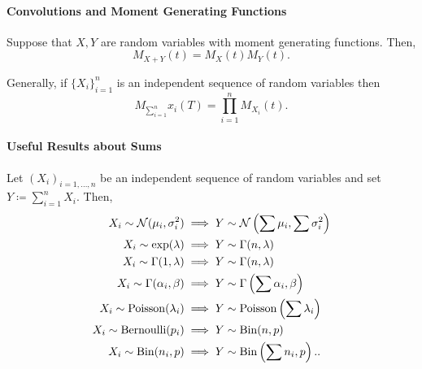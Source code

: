 \paragraph{Convolutions and Moment Generating Functions}
Suppose that \( X, Y \) are random variables with moment
generating functions. Then, \[
    M_{X + Y}(t) = M_X(t) M_Y(t)
.\]

Generally, if \( \{X_i\}_{i=1}^n  \) is an independent sequence of random variables
then  \[
    M_{\sum_{i=1}^n} x_i (T) = \prod_{i=1}^n M_{X_i} (t)
.\]

\paragraph{Useful Results about Sums}
Let \( (X_i)_{i = 1, \ldots, n} \) be an independent sequence of random
variables and set \( Y \coloneqq \sum_{i=1}^{n} X_i \).
Then,
\begin{align*}
    X_i \sim \mathcal{N}(\mu_i, \sigma_i^2)
        &\implies Y \sim \mathcal{N} \left( \sum \mu_i, \sum \sigma_i^2 \right) \\
    X_i \sim \exp(\lambda)
        &\implies Y \sim \Gamma(n, \lambda) \\
    X_i \sim \Gamma(1, \lambda)
        &\implies Y \sim \Gamma(n, \lambda) \\
    X_i \sim \Gamma(\alpha_i, \beta)
        &\implies Y \sim \Gamma\left(\sum \alpha_i, \beta \right) \\
    X_i \sim \mathrm{Poisson}(\lambda_i)
        &\implies Y \sim \mathrm{Poisson}\left(\sum \lambda_i\right) \\
    X_i \sim \mathrm{Bernoulli}(p_i)
        &\implies Y \sim \mathrm{Bin}(n, p) \\
    X_i \sim \mathrm{Bin}(n_i, p)
        &\implies Y \sim \mathrm{Bin}\left(\sum n_i, p\right).
.\end{align*}

